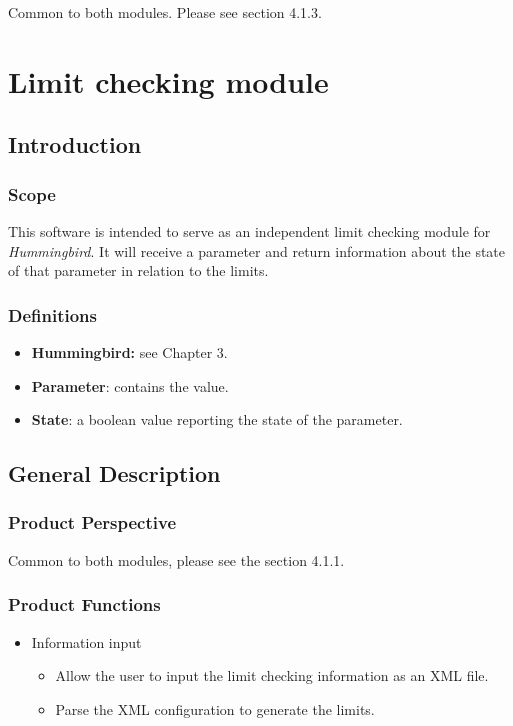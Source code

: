 Common to both modules. Please see section 4.1.3.

\section{Limit checking module}

\subsection{Introduction}

\subsubsection{Scope}

This software is intended to serve as an independent limit checking module for \emph{Hummingbird}. It will receive a parameter and return information about the state of that parameter in relation to the limits.

\subsubsection{Definitions}

\begin{itemize}
\item \textbf{Hummingbird:} see Chapter 3.
\item \textbf{Parameter}: contains the value.
\item \textbf{State}: a boolean value reporting the state of the parameter.
\end{itemize}

\subsection{General Description}
\subsubsection{Product Perspective}

Common to both modules, please see the section 4.1.1.

\subsubsection{Product Functions}

\begin{itemize}
\item Information input
\begin{itemize}
\item Allow the user to input the limit checking information as an XML file.
\item Parse the XML configuration to generate the limits.
\end{itemize}


\end{itemize}

